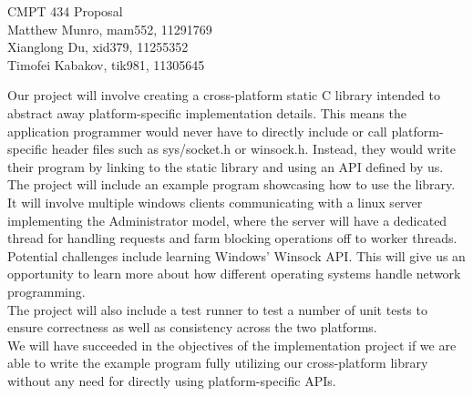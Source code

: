 \documentclass{article}
\begin{document}
\begin{center}
CMPT 434 Proposal \\
Matthew Munro, mam552, 11291769 \\
Xianglong Du, xid379, 11255352 \\
Timofei Kabakov, tik981, 11305645 \\
\end{center}
\pagebreak

Our project will involve creating a cross-platform static C library intended to 
abstract away platform-specific implementation details. This means the application programmer would never have to directly 
include or call platform-specific header files such as sys/socket.h or winsock.h. Instead, they would write their program by 
linking to the static library and using an API defined by us. \\

The project will include an example program showcasing how to use the library. It will involve multiple windows clients 
communicating with a linux server implementing the Administrator model, where the server will have a dedicated thread for handling requests 
and farm blocking operations off to worker threads. \\

Potential challenges include learning Windows' Winsock API. This will give us an opportunity to learn more about 
how different operating systems handle network programming. \\

The project will also include a test runner to test a number of unit tests to ensure correctness as well as consistency across the two platforms. \\

We will have succeeded in the objectives of the implementation project if we are able to write the example program fully utilizing our 
cross-platform library without any need for directly using platform-specific APIs. 
\end{document}
